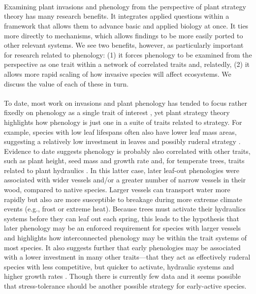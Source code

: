 \documentclass[11pt,a4paper,oneside]{article}
\begin{document}
\\
\\
\\
Examining plant invasions and phenology from the perspective of plant strategy theory has many research benefits. It integrates applied questions within a framework that allows them to advance basic and applied biology at once. It ties more directly to mechanisms, which allows findings to be more easily ported to other relevant systems. We see two benefits, however, as particularly important for research related to phenology: (1)  it forces phenology to be examined from the perspective as one trait within a network of correlated traits and, relatedly, (2) it allows more rapid scaling of how invasive species will affect ecosystems. We discuss the value of each of these in turn.\\
\\
To date, most work on invasions and plant phenology has tended to focus rather fixedly on phenology as a single trait of interest \citep[but see][]{Sun:2011eu,hahn2012}, yet plant strategy theory \citep{crainebook} highlights how phenology is just one in a suite of traits related to strategy. For example, species with low leaf lifespans often also have lower leaf mass areas, suggesting a relatively low investment in leaves and possibly ruderal strategy \citep{Mack:1996ly}. Evidence to date suggests phenology is probably also correlated with other traits, such as plant height, seed mass \citep{Bolmgren:2008vo} and growth rate \citep{Sun:2011eu} and, for temperate trees, traits related to plant hydraulics \citep{Lechowicz:1984cr}. In this latter case, later leaf-out phenologies were associated with wider vessels and/or a greater number of narrow vessels in their wood, compared to native species. Larger vessels can transport water more rapidly but also are more susceptible to breakage during more extreme climate events (e.g., frost or extreme heat). Because trees must activate their hydraulics systems before they can leaf out each spring, this leads to the hypothesis \citep{Lechowicz:1984cr} that later phenology may be an enforced requirement for species with larger vessels and highlights how interconnected phenology may be within the trait systems of most species. It also suggests further that early phenologies may be associated with a lower investment in many other traits---that they act as effectively ruderal species with less competitive, but quicker to activate, hydraulic systems \citep{Lechowicz:1984cr} and higher growth rates \citep{Sun:2011eu,hahn2012}. Though there is currently few data and it seems possible that stress-tolerance should be another possible strategy for early-active species.\\
\end{document}

